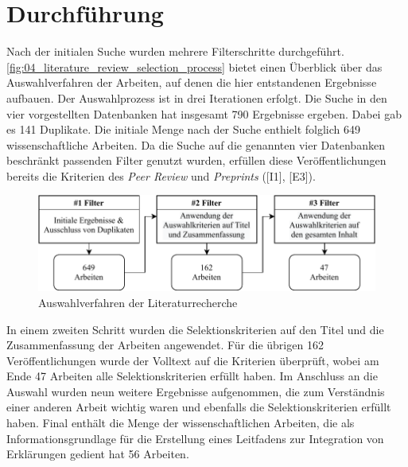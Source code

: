 \section{Durchführung}


Nach der initialen Suche wurden mehrere Filterschritte durchgeführt. \autoref{fig:04_literature_review_selection_process} bietet einen Überblick über das Auswahlverfahren der Arbeiten, auf denen die hier entstandenen Ergebnisse aufbauen. Der Auswahlprozess ist in drei Iterationen erfolgt. Die Suche in den vier vorgestellten Datenbanken hat insgesamt 790 Ergebnisse ergeben. Dabei gab es 141 Duplikate. Die initiale Menge nach der Suche enthielt folglich 649 wissenschaftliche Arbeiten. Da die Suche auf die genannten vier Datenbanken beschränkt passenden Filter genutzt wurden, erfüllen diese Veröffentlichungen bereits die Kriterien des \textit{Peer Review} und \textit{Preprints} ([I1], [E3]).

\begin{figure}[htb]
    \centering
    \includegraphics[width=\textwidth]{contents/04_literature_review/res/selection_process.pdf}
    \caption{Auswahlverfahren der Literaturrecherche}
    \label{fig:04_literature_review_selection_process}
\end{figure}

In einem zweiten Schritt wurden die Selektionskriterien auf den Titel und die Zusammenfassung der Arbeiten angewendet. Für die übrigen 162 Veröffentlichungen wurde der Volltext auf die Kriterien überprüft, wobei am Ende 47 Arbeiten alle Selektionskriterien erfüllt haben. Im Anschluss an die Auswahl wurden neun weitere Ergebnisse aufgenommen, die zum Verständnis einer anderen Arbeit wichtig waren und ebenfalls die Selektionskriterien erfüllt haben. Final enthält die Menge der wissenschaftlichen Arbeiten, die als Informationsgrundlage für die Erstellung eines Leitfadens zur Integration von Erklärungen gedient hat 56 Arbeiten.